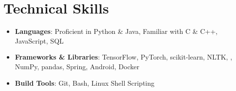 \documentclass[letterpaper,10pt]{article}
\newcommand{\resumeSubHeadingListStart}{\begin{itemize}[leftmargin=\hoffset]}
\newcommand{\resumeSubHeadingListEnd}{\end{itemize}}
\begin{document}
	\section{\faBolt \space Technical Skills}
	\resumeSubHeadingListStart
	\item{
		\textbf{Languages}{: Proficient in Python \& Java, Familiar with C \& C++, JavaScript, SQL}}
	\vspace{-4pt}
	\item{
		\textbf{Frameworks \& Libraries}{: TensorFlow, PyTorch, scikit-learn, NLTK, , NumPy, pandas, Spring, Android, Docker}}
	\vspace{-4pt}
	\item{
		\textbf{Build Tools}{: Git, Bash, Linux Shell Scripting}}
	\resumeSubHeadingListEnd
	
	
	
\end{document}
